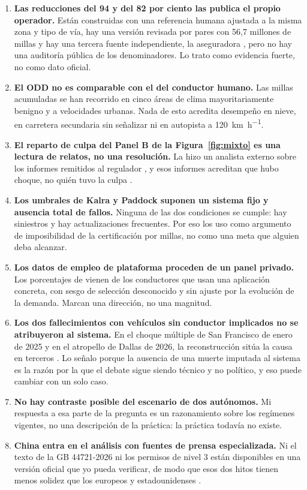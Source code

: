 \documentclass[11pt,letterpaper]{article}
\begin{document}
\begin{enumerate}
  \item \textbf{Las reducciones del 94 y del 82 por ciento las publica el propio
    operador.} Están construidas con una referencia humana ajustada a la misma
    zona y tipo de vía, hay una versión revisada por pares con 56,7 millones de
    millas \parencite{kusano2025} y hay una tercera fuente independiente, la
    aseguradora \parencite{dilillo2024}, pero no hay una auditoría pública de los
    denominadores. Lo trato como evidencia fuerte, no como dato oficial.
  \item \textbf{El ODD no es comparable con el del conductor humano.} Las millas
    acumuladas se han recorrido en cinco áreas de clima mayoritariamente benigno
    y a velocidades urbanas. Nada de esto acredita desempeño en nieve, en
    carretera secundaria sin señalizar ni en autopista a
    \qty{120}{\kilo\meter\per\hour}.
  \item \textbf{El reparto de culpa del Panel B de la Figura~\ref{fig:mixto} es
    una lectura de relatos, no una resolución.} La hizo un analista externo sobre
    los informes remitidos al regulador \parencite{lee2026}, y esos informes
    acreditan que hubo choque, no quién tuvo la culpa \parencite{nhtsasgo2026}.
  \item \textbf{Los umbrales de Kalra y Paddock suponen un sistema fijo y
    ausencia total de fallos.} Ninguna de las dos condiciones se cumple: hay
    siniestros y hay actualizaciones frecuentes. Por eso los uso como argumento
    de imposibilidad de la certificación por millas, no como una meta que
    alguien deba alcanzar.
  \item \textbf{Los datos de empleo de plataforma proceden de un panel privado.}
    Los porcentajes de \textcite{gridwise2026} vienen de los conductores que usan
    una aplicación concreta, con sesgo de selección desconocido y sin ajuste por
    la evolución de la demanda. Marcan una dirección, no una magnitud.
  \item \textbf{Los dos fallecimientos con vehículos sin conductor implicados no
    se atribuyeron al sistema.} En el choque múltiple de San Francisco de enero
    de 2025 y en el atropello de Dallas de 2026, la reconstrucción sitúa la causa
    en terceros \parencite{nbcbay2025,templeton2026}. Lo señalo porque la
    ausencia de una muerte imputada al sistema es la razón por la que el debate
    sigue siendo técnico y no político, y eso puede cambiar con un solo caso.
  \item \textbf{No hay contraste posible del escenario de dos autónomos.} Mi
    respuesta a esa parte de la pregunta es un razonamiento sobre los regímenes
    vigentes, no una descripción de la práctica: la práctica todavía no existe.
  \item \textbf{China entra en el análisis con fuentes de prensa
    especializada.} Ni el texto de la GB 44721-2026 ni los permisos de nivel 3
    están disponibles en una versión oficial que yo pueda verificar, de modo que
    esos dos hitos tienen menos solidez que los europeos y estadounidenses
    \parencite{cnevpost2025,techtimes2026}.
\end{enumerate}
\end{document}
